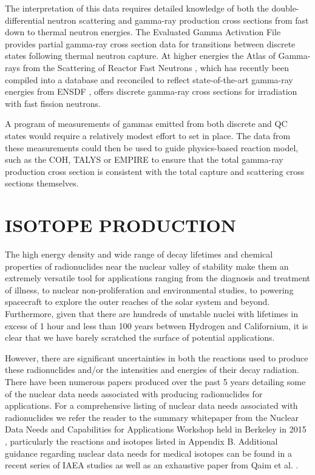\documentclass[letterpaper]{ar-1col}
\begin{document}
The interpretation of this data requires detailed knowledge of both the double-differential neutron scattering and gamma-ray production cross sections from fast down to thermal neutron energies.  The Evaluated Gamma Activation File \cite{Fir15} provides partial gamma-ray cross section data for transitions between discrete states following thermal neutron capture.  At higher energies the Atlas of Gamma-rays from the Scattering of Reactor Fast Neutrons \cite{Dem78}, which has recently been compiled into a database and reconciled to reflect state-of-the-art gamma-ray energies from ENSDF \cite{Hur18}, offers discrete gamma-ray cross sections for irradiation with fast fission neutrons.  

A program of measurements of gammas emitted from both discrete and QC states would require a relatively modest effort to set in place.  The data from these measurements could then be used to guide physics-based reaction model, such as the COH, TALYS or EMPIRE to ensure that the total gamma-ray production cross section is consistent with the total capture and scattering cross sections themselves. 


\section{ISOTOPE PRODUCTION}\label{sec:isotope_production}


The high energy density and wide range of decay lifetimes and chemical properties of radionuclides near the nuclear valley of stability make them an extremely versatile tool for applications ranging from the diagnosis and treatment of illness, to nuclear non-proliferation and environmental studies, to powering spacecraft to explore the outer reaches of the solar system and beyond. Furthermore, given that there are hundreds of unstable nuclei with lifetimes in excess of 1 hour and less than 100 years between Hydrogen and Californium, it is clear that we have barely scratched the surface of potential applications.

However, there are significant uncertainties in both the reactions used to produce these radionuclides and/or the intensities and energies of their decay radiation.  There have been numerous papers produced over the past 5 years detailing some of the nuclear data needs associated with producing radionuclides for applications. For a comprehensive listing of nuclear data needs associated with radionuclides we refer the reader to the summary whitepaper from the Nuclear Data Needs and Capabilities for Applications Workshop held in Berkeley in 2015 \cite{bernstein2015nuclear}, particularly the reactions and isotopes listed in Appendix B.  Additional guidance regarding nuclear data needs for medical isotopes can be found in a recent series of IAEA studies \cite{Iae675,Iae596,Iae591} as well as an exhaustive paper from Qaim et al. \cite{Qaim201731}.
\end{document}
